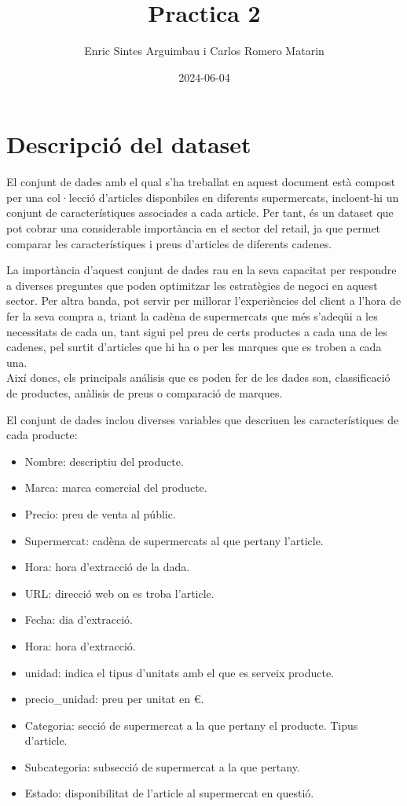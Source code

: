 \documentclass[
]{article}
\title{Practica 2}
\author{Enric Sintes Arguimbau i Carlos Romero Matarin}
\date{2024-06-04}
\providecommand{\tightlist}{%
  \setlength{\itemsep}{0pt}\setlength{\parskip}{0pt}}
\begin{document}
\maketitle

{
\setcounter{tocdepth}{2}
\tableofcontents
}
\newpage

\hypertarget{descripciuxf3-del-dataset}{%
\section{Descripció del dataset}\label{descripciuxf3-del-dataset}}

El conjunt de dades amb el qual s'ha treballat en aquest document està
compost per una col·lecció d'articles disponbiles en diferents
supermercats, incloent-hi un conjunt de característiques associades a
cada article. Per tant, és un dataset que pot cobrar una considerable
importància en el sector del retail, ja que permet comparar les
característiques i preus d'articles de diferents cadenes.

La importància d'aquest conjunt de dades rau en la seva capacitat per
respondre a diverses preguntes que poden optimitzar les estratègies de
negoci en aquest sector. Per altra banda, pot servir per millorar
l'experiències del client a l'hora de fer la seva compra a, triant la
cadèna de supermercats que més s'adeqüi a les necessitats de cada un,
tant sigui pel preu de certs productes a cada una de les cadenes, pel
surtit d'articles que hi ha o per les marques que es troben a cada
una.\\
Així doncs, els principals análisis que es poden fer de les dades son,
classificació de productes, anàlisis de preus o comparació de marques.

El conjunt de dades inclou diverses variables que descriuen les
característiques de cada producte:

\begin{itemize}
\tightlist
\item
  Nombre: descriptiu del producte.
\item
  Marca: marca comercial del producte.
\item
  Precio: preu de venta al públic.
\item
  Supermercat: cadèna de supermercats al que pertany l'article.
\item
  Hora: hora d'extracció de la dada.
\item
  URL: direcció web on es troba l'article.
\item
  Fecha: dia d'extracció.
\item
  Hora: hora d'extracció.
\item
  unidad: indica el tipus d'unitats amb el que es serveix producte.
\item
  precio\_unidad: preu per unitat en €.
\item
  Categoria: secció de supermercat a la que pertany el producte. Tipus
  d'article.
\item
  Subcategoria: subsecció de supermercat a la que pertany.
\item
  Estado: disponibilitat de l'article al supermercat en questió.
\end{itemize}
\end{document}
